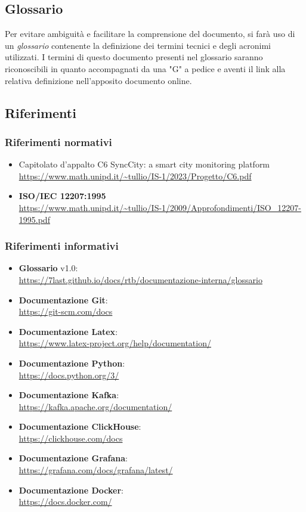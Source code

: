 \subsection{Glossario}
Per evitare ambiguità e facilitare la comprensione del documento, si farà uso di un \textit{glossario} contenente la definizione dei termini tecnici e degli acronimi utilizzati. I termini di questo documento presenti nel glossario saranno riconoscibili in quanto accompagnati da una "G" a pedice e aventi il link alla relativa definizione nell'apposito documento online.

\subsection{Riferimenti}
\subsubsection{Riferimenti normativi}
\begin{itemize}
	\item Capitolato d'appalto C6 SyncCity: a smart city monitoring platform \\ \url{https://www.math.unipd.it/~tullio/IS-1/2023/Progetto/C6.pdf}
	\item \textbf{ISO/IEC 12207:1995} \\ \url{https://www.math.unipd.it/~tullio/IS-1/2009/Approfondimenti/ISO_12207-1995.pdf}
\end{itemize}

\subsubsection{Riferimenti informativi}
\begin{itemize}
    \item\textbf{Glossario} v1.0:\\ \url{https://7last.github.io/docs/rtb/documentazione-interna/glossario}
    \item\textbf{Documentazione Git}:\\ \url{https://git-scm.com/docs}
    \item\textbf{Documentazione Latex}:\\ \url{https://www.latex-project.org/help/documentation/}
    \item\textbf{Documentazione Python}:\\ \url{https://docs.python.org/3/}
    \item\textbf{Documentazione Kafka}:\\ \url{https://kafka.apache.org/documentation/}
    \item\textbf{Documentazione ClickHouse}:\\ \url{https://clickhouse.com/docs}
    \item\textbf{Documentazione Grafana}:\\ \url{https://grafana.com/docs/grafana/latest/}
    \item\textbf{Documentazione Docker}:\\ \url{https://docs.docker.com/}
\end{itemize}